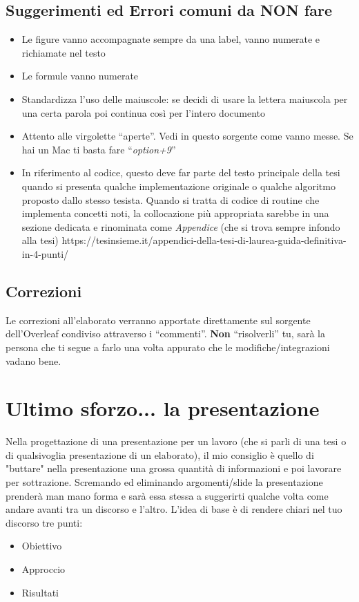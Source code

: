 \subsection{Suggerimenti ed Errori comuni da NON fare}
\begin{itemize}
    \item Le figure vanno accompagnate sempre da una label, vanno numerate e richiamate nel testo
    \item Le formule vanno numerate
    \item Standardizza l'uso delle maiuscole: se decidi di usare la lettera maiuscola per una certa parola poi continua così per l'intero documento
    \item Attento alle virgolette ``aperte''. Vedi in questo sorgente come vanno messe. Se hai un Mac ti basta fare ``\textit{option+9}''
    \item In riferimento al codice,  questo deve far parte del testo principale della tesi quando si presenta qualche implementazione originale o qualche algoritmo proposto dallo stesso tesista. Quando si tratta di codice di routine che implementa concetti noti, la collocazione più appropriata sarebbe in una sezione dedicata e rinominata come \textit{Appendice } (che si trova sempre infondo alla tesi) https://tesinsieme.it/appendici-della-tesi-di-laurea-guida-definitiva-in-4-punti/

\end{itemize}

\subsection{Correzioni}

Le correzioni all'elaborato verranno apportate direttamente sul sorgente dell'Overleaf condiviso attraverso i ``commenti''. \textbf{Non} ``risolverli'' tu, sarà la persona che ti segue a farlo una volta appurato che le modifiche/integrazioni vadano bene.

\section{Ultimo sforzo... la presentazione}
Nella progettazione di una presentazione per un lavoro (che si parli di una tesi o di qualsivoglia presentazione di un elaborato), il mio consiglio è quello di "buttare" nella presentazione una grossa quantità di informazioni e poi lavorare per sottrazione. Scremando ed eliminando argomenti/slide la presentazione prenderà man mano forma e sarà essa stessa a suggerirti qualche volta come andare avanti tra un discorso e l'altro. L'idea di base è di rendere chiari nel tuo discorso tre punti:
\begin{itemize}
    \item Obiettivo
    \item Approccio
    \item Risultati
\end{itemize}
